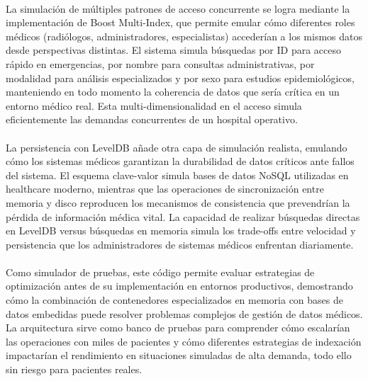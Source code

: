 \documentclass[12pt]{article}
\begin{document}
	\paragraph*{}
	La simulación de múltiples patrones de acceso concurrente se logra mediante la implementación de Boost Multi-Index, que permite emular cómo diferentes roles médicos (radiólogos, administradores, especialistas) accederían a los mismos datos desde perspectivas distintas. El sistema simula búsquedas por ID para acceso rápido en emergencias, por nombre para consultas administrativas, por modalidad para análisis especializados y por sexo para estudios epidemiológicos, manteniendo en todo momento la coherencia de datos que sería crítica en un entorno médico real. Esta multi-dimensionalidad en el acceso simula eficientemente las demandas concurrentes de un hospital operativo.
	
	\paragraph*{}
	La persistencia con LevelDB añade otra capa de simulación realista, emulando cómo los sistemas médicos garantizan la durabilidad de datos críticos ante fallos del sistema. El esquema clave-valor simula bases de datos NoSQL utilizadas en healthcare moderno, mientras que las operaciones de sincronización entre memoria y disco reproducen los mecanismos de consistencia que prevendrían la pérdida de información médica vital. La capacidad de realizar búsquedas directas en LevelDB versus búsquedas en memoria simula los trade-offs entre velocidad y persistencia que los administradores de sistemas médicos enfrentan diariamente.
	
	\paragraph*{}
	Como simulador de pruebas, este código permite evaluar estrategias de optimización antes de su implementación en entornos productivos, demostrando cómo la combinación de contenedores especializados en memoria con bases de datos embedidas puede resolver problemas complejos de gestión de datos médicos. La arquitectura sirve como banco de pruebas para comprender cómo escalarían las operaciones con miles de pacientes y cómo diferentes estrategias de indexación impactarían el rendimiento en situaciones simuladas de alta demanda, todo ello sin riesgo para pacientes reales.
	
\end{document}
